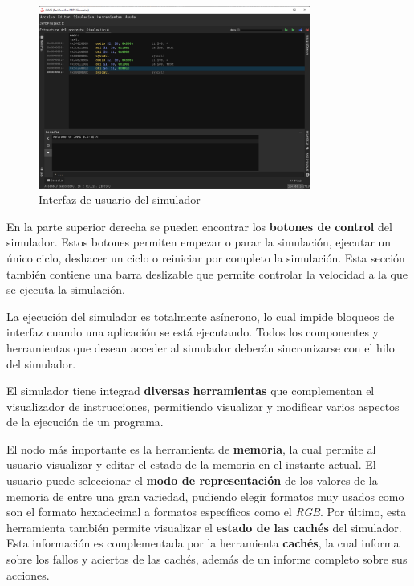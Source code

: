\begin{figure}[h]
    \centering
    \includegraphics[width=0.8\textwidth]{images/mips/jams-simulation}
    \caption{Interfaz de usuario del simulador}
    \label{fig:jams-simulation}
\end{figure}

En la parte superior derecha se pueden encontrar los
\textbf{botones de control} del simulador.
Estos botones permiten empezar o parar la simulación, ejecutar un
único ciclo, deshacer un ciclo o reiniciar por completo la simulación.
Esta sección también contiene una barra deslizable que permite controlar
la velocidad a la que se ejecuta la simulación.

La ejecución del simulador es totalmente asíncrono, lo cual
impide bloqueos de interfaz cuando una aplicación se está ejecutando.
Todos los componentes y herramientas que desean acceder al simulador
deberán sincronizarse con el hilo del simulador.

El simulador tiene integrad \textbf{diversas herramientas} que complementan
el visualizador de instrucciones, permitiendo visualizar y modificar varios
aspectos de la ejecución de un programa.

El nodo más importante es la herramienta de \textbf{memoria},
la cual permite al usuario visualizar y editar el estado de la memoria
 en el instante actual.
El usuario puede seleccionar el \textbf{modo de representación} de los valores
de la memoria de entre una gran variedad, pudiendo elegir formatos
muy usados como son el formato hexadecimal a formatos específicos
como el \textit{RGB}.
Por último, esta herramienta también permite visualizar el \textbf{estado
de las cachés} del simulador.
Esta información es complementada por la herramienta \textbf{cachés},
la cual informa sobre los fallos y aciertos de las cachés, además de un
informe completo sobre sus acciones.

